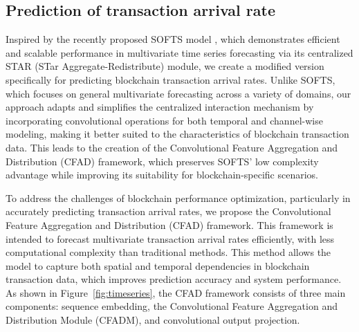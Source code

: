 \documentclass[a4paper,fleqn]{cas-dc}
\begin{document}


\subsection{Prediction of transaction arrival rate}
\vspace{6pt}
Inspired by the recently proposed SOFTS model \citep{han2024softs}, which demonstrates efficient and scalable performance in multivariate time series forecasting via its centralized STAR (STar Aggregate-Redistribute) module, we create a modified version specifically for predicting blockchain transaction arrival rates. Unlike SOFTS, which focuses on general multivariate forecasting across a variety of domains, our approach adapts and simplifies the centralized interaction mechanism by incorporating convolutional operations for both temporal and channel-wise modeling, making it better suited to the characteristics of blockchain transaction data. This leads to the creation of the Convolutional Feature Aggregation and Distribution (CFAD) framework, which preserves SOFTS' low complexity advantage while improving its suitability for blockchain-specific scenarios.

To address the challenges of blockchain performance optimization, particularly in accurately predicting transaction arrival rates, we propose the Convolutional Feature Aggregation and Distribution (CFAD) framework. This framework is intended to forecast multivariate transaction arrival rates efficiently, with less computational complexity than traditional methods. 
This method allows the model to capture both spatial and temporal dependencies in blockchain transaction data, which improves prediction accuracy and system performance. As shown in Figure~\ref{fig:timeseries}, the CFAD framework consists of three main components: sequence embedding, the Convolutional Feature Aggregation and Distribution Module (CFADM), and convolutional output projection.
\end{document}
